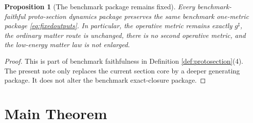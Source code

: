 \documentclass[11pt]{article}
\newcommand{\CompletedMetric}{g^{\sharp}}
\newtheorem{proposition}{Proposition}
\begin{document}
\begin{proposition}[The benchmark package remains fixed]
\label{prop:benchmark}
Every benchmark-faithful proto-section dynamics package preserves the same benchmark one-metric package \eqref{eq:fixedoutputs}. In particular, the operative metric remains exactly \(\CompletedMetric\), the ordinary matter route is unchanged, there is no second operative metric, and the low-energy matter law is not enlarged.
\end{proposition}

\begin{proof}
This is part of benchmark faithfulness in Definition \ref{def:protosection}(4). The present note only replaces the current section core by a deeper generating package. It does not alter the benchmark exact-closure package.
\end{proof}

\section{Main Theorem}
\end{document}
